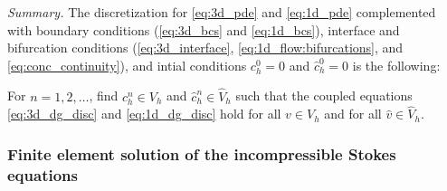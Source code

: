  \textit{Summary.} The discretization for \eqref{eq:3d_pde} and \eqref{eq:1d_pde} complemented with boundary conditions (\eqref{eq:3d_bcs} and \eqref{eq:1d_bcs}), interface and bifurcation  conditions (\eqref{eq:3d_interface}, \eqref{eq:1d_flow:bifurcations}, and \eqref{eq:conc_continuity}), and intial conditions $c_h^0 =0 $ and $\hat c_h^0 = 0 $ is the following: 

 For $n = 1,2, \ldots $, find  $c_h^n \in V_h$ and $\hat c^n_h \in \hat V_h$ such that the coupled equations \eqref{eq:3d_dg_disc} and \eqref{eq:1d_dg_disc} hold for all $v \in V_h$ and for all $\hat v \in \hat V_h$. 
\subsubsection{Finite element solution of the incompressible Stokes equations}

